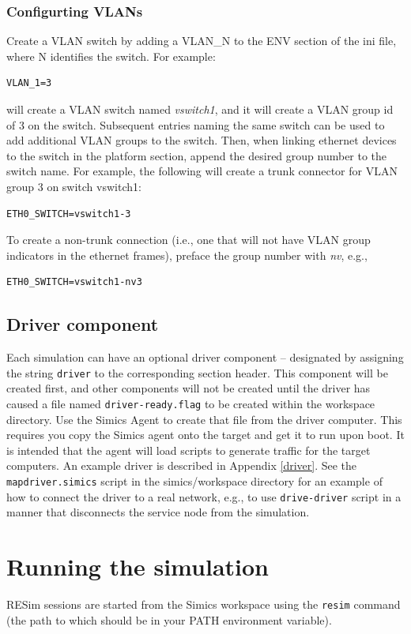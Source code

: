 \documentclass[titlepage]{article}
\begin{document}
\subsubsection{Configurting VLANs}
Create a VLAN switch by adding a {VLAN\_N} to the ENV section of the ini file, where N identifies the switch.  For example:
\begin{verbatim}
VLAN_1=3
\end{verbatim}
\noindent will create a VLAN switch named \textit{vswitch1}, and it will create a VLAN group id of 3 on the switch.  Subsequent entries naming the same switch
can be used to add additional VLAN groups to the switch.  Then, when linking ethernet devices to the switch in the platform section, append the desired group 
number to the switch name.  For example, the following will create a trunk connector for VLAN group 3 on switch vswitch1:
\begin{verbatim}
ETH0_SWITCH=vswitch1-3
\end{verbatim}
\noindent To create a non-trunk connection (i.e., one that will not have VLAN group indicators in the ethernet frames), preface the group number with 
\textit{nv}, e.g.,
\begin{verbatim}
ETH0_SWITCH=vswitch1-nv3
\end{verbatim}

\subsection{Driver component}
Each simulation can have an optional driver component -- designated by assigning the string {\tt driver} to the corresponding
section header.  This component will be created first, and other components will not be created until the driver has
caused a file named {\tt driver-ready.flag} to be created within the workspace directory.  Use the Simics Agent to 
create that file from the driver computer.  This requires you copy the Simics agent onto the target and get it to run
upon boot.  It is intended that the agent will load scripts to generate traffic for the target computers.  
An example driver is described in Appendix \ref{driver}.   
See the {\tt mapdriver.simics} script in the simics/workspace directory for an example of how to connect the driver to a real network,
e.g., to use {\tt drive-driver} script in a manner that disconnects the service node from the simulation.

\section{Running the simulation}
\label{running}
RESim sessions are started from the Simics workspace using the {\tt resim} command (the path to which should be in your PATH
environment variable).
\end{document}
